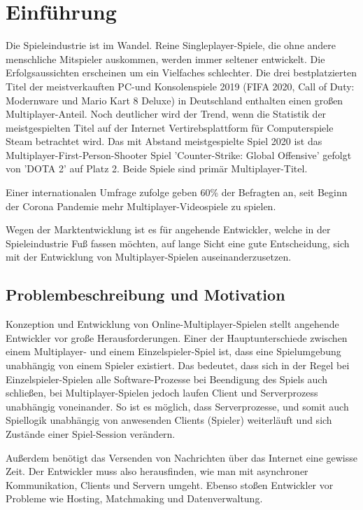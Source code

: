 \chapter{Einführung}
\label{sec:einfuehrung}

Die Spieleindustrie ist im Wandel. Reine Singleplayer-Spiele, die ohne andere menschliche Mitspieler auskommen, werden immer seltener entwickelt. Die Erfolgsaussichten erscheinen um ein Vielfaches schlechter. Die drei bestplatzierten Titel der meistverkauften PC-und Konsolenspiele 2019 (FIFA 2020, Call of Duty: Modernware und Mario Kart 8 Deluxe) in Deutschland enthalten einen großen Multiplayer-Anteil.\cite{gameVerbandderdeutschenGamesBranchee.V..2020} Noch deutlicher wird der Trend, wenn die Statistik der meistgespielten Titel auf der Internet Vertirebsplattform für Computerspiele Steam betrachtet wird. Das mit Abstand meistgespielte Spiel 2020 ist das Multiplayer-First-Person-Shooter Spiel 'Counter-Strike: Global Offensive' gefolgt von 'DOTA 2' auf Platz 2. Beide Spiele sind primär Multiplayer-Titel.\cite{GitHyp.February2021}

Einer internationalen Umfrage zufolge geben 60\% der Befragten an, seit Beginn der Corona Pandemie mehr Multiplayer-Videospiele zu spielen. \cite{SimonKucher&Partners.2020}

Wegen der Marktentwicklung ist es für angehende Entwickler, welche in der Spieleindustrie Fuß fassen möchten, auf lange Sicht eine gute Entscheidung, sich mit der Entwicklung von Multiplayer-Spielen auseinanderzusetzen.

\section{Problembeschreibung und Motivation}

Konzeption und Entwicklung von Online-Multiplayer-Spielen stellt angehende Entwickler vor große Herausforderungen. Einer der Hauptunterschiede zwischen einem Multiplayer- und einem Einzelspieler-Spiel ist, dass eine Spielumgebung unabhängig von einem Spieler existiert. Das bedeutet, dass sich in der Regel bei Einzelspieler-Spielen alle Software-Prozesse bei Beendigung des Spiels auch schließen, bei Multiplayer-Spielen jedoch laufen Client und Serverprozess unabhängig voneinander. So ist es möglich, dass Serverprozesse, und somit auch Spiellogik unabhängig von anwesenden Clients (Spieler) weiterläuft und sich Zustände einer Spiel-Session verändern. 

Außerdem benötigt das Versenden von Nachrichten über das Internet eine gewisse Zeit. Der Entwickler muss also herausfinden, wie man mit asynchroner Kommunikation, Clients und Servern umgeht. Ebenso stoßen Entwickler vor Probleme wie Hosting, Matchmaking und Datenverwaltung.
\cite{Payne.18.09.2019}

